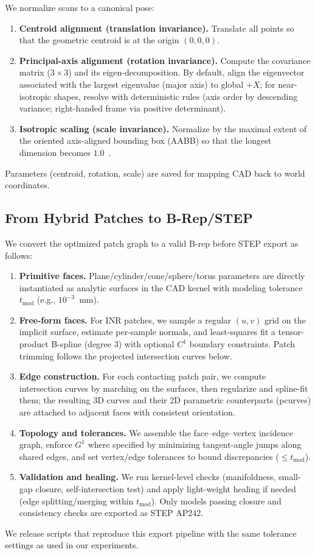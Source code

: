 \documentclass{ieeeaccess}
\begin{document}
We normalize scans to a canonical pose:
\begin{enumerate}
  \item \textbf{Centroid alignment (translation invariance).} Translate all points so that the geometric centroid is at the origin \((0,0,0)\).
  \item \textbf{Principal-axis alignment (rotation invariance).} Compute the covariance matrix (\(3\times 3\)) and its eigen-decomposition. By default, align the eigenvector associated with the largest eigenvalue (major axis) to global \(+X\); for near-isotropic shapes, resolve with deterministic rules (axis order by descending variance; right-handed frame via positive determinant).
  \item \textbf{Isotropic scaling (scale invariance).} Normalize by the maximal extent of the oriented axis-aligned bounding box (AABB) so that the longest dimension becomes \(1.0\)~.
\end{enumerate}
Parameters (centroid, rotation, scale) are saved for mapping CAD back to world coordinates.

\subsection{From Hybrid Patches to B-Rep/STEP}
\label{sec:brep_export}
We convert the optimized patch graph to a valid B-rep before STEP export as follows:
\begin{enumerate}
  \item \textbf{Primitive faces.} Plane/cylinder/cone/sphere/torus parameters are directly instantiated as analytic surfaces in the CAD kernel with modeling tolerance $t_{\mathrm{mod}}$ (e.g., $10^{-3}$~mm).
  \item \textbf{Free-form faces.} For INR patches, we sample a regular $(u,v)$ grid on the implicit surface, estimate per-sample normals, and least-squares fit a tensor-product B-spline (degree 3) with optional $C^1$ boundary constraints. Patch trimming follows the projected intersection curves below.
  \item \textbf{Edge construction.} For each contacting patch pair, we compute intersection curves by marching on the surfaces, then regularize and spline-fit them; the resulting 3D curves and their 2D parametric counterparts (pcurves) are attached to adjacent faces with consistent orientation.
  \item \textbf{Topology and tolerances.} We assemble the face–edge–vertex incidence graph, enforce $G^1$ where specified by minimizing tangent-angle jumps along shared edges, and set vertex/edge tolerances to bound discrepancies ($\le t_{\mathrm{mod}}$).
  \item \textbf{Validation and healing.} We run kernel-level checks (manifoldness, small-gap closure, self-intersection test) and apply light-weight healing if needed (edge splitting/merging within $t_{\mathrm{mod}}$). Only models passing closure and consistency checks are exported as STEP AP242.
\end{enumerate}
We release scripts that reproduce this export pipeline with the same tolerance settings as used in our experiments.
\end{document}
